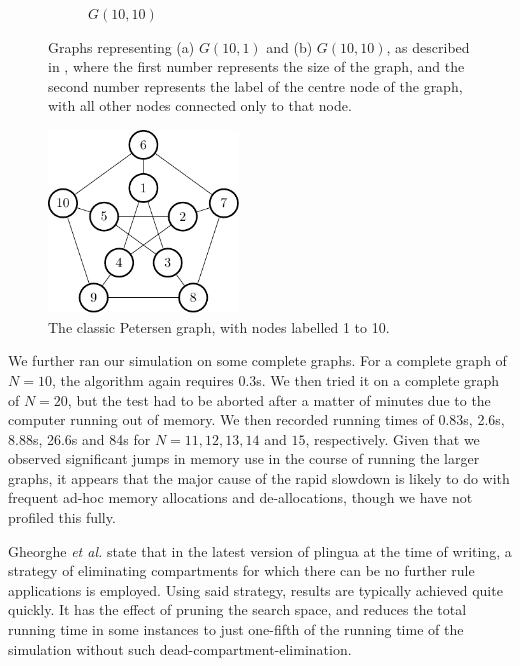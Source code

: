 \begin{figure}
\begin{subfigure}[b]{0.35\textwidth}
        \caption{\label{fig:g-10-10}\(G(10,10)\)}
    \end{subfigure}
    \caption[Graphs representing \(G(10,1)\) and \(G(10,10)\)]{\label{fig:gs}Graphs representing (a) \(G(10,1)\) and (b) \(G(10,10)\), as described in \cite{Gheorghe2013}, where the first number represents the size of the graph, and the second number represents the label of the centre node of the graph, with all other nodes connected only to that node.}
\end{figure}

\begin{figure}
    \centering
    \includegraphics[width=0.45\textwidth]{chapters/gcol/figs/petersen-figure0.pdf}
    \caption{\label{fig:petersen}The classic Petersen graph, with nodes labelled 1 to 10.}
\end{figure}

We further ran our simulation on some complete graphs.  For a complete graph of \(N = 10\), the algorithm again requires 0.3s.  We then tried it on a complete graph of \(N = 20\), but the test had to be aborted after a matter of minutes due to the computer running out of memory.  We then recorded running times of 0.83s, 2.6s, 8.88s, 26.6s and 84s for \(N = 11, 12, 13, 14\) and \(15\), respectively.  Given that we observed significant jumps in memory use in the course of running the larger graphs, it appears that the major cause of the rapid slowdown is likely to do with frequent ad-hoc memory allocations and de-allocations, though we have not profiled this fully.


Gheorghe \textit{et al.} state \cite[p.~828]{Gheorghe2013} that in the latest version of \gls{plingua} at the time of writing, a strategy of eliminating compartments for which there can be no further rule applications is employed.  Using said strategy, results are typically achieved quite quickly.  It has the effect of pruning the search space, and reduces the total running time in some instances to just one-fifth of the running time of the simulation without such dead-compartment-elimination.

